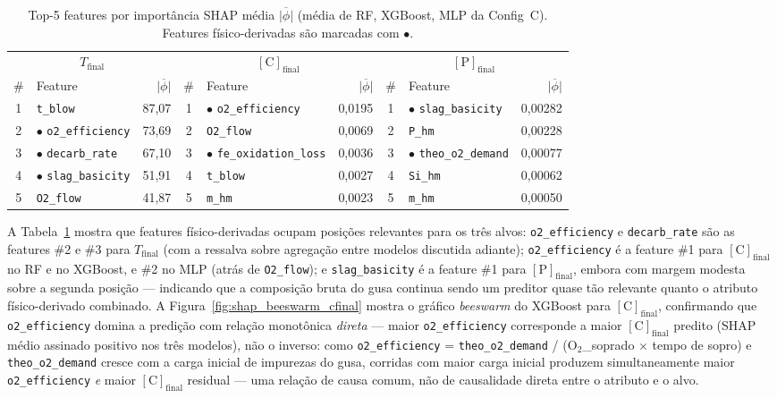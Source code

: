 \begin{table}[H]
\caption{Top-5 features por importância SHAP média $\overline{|\phi|}$ (média de RF, XGBoost, MLP da Config~C). Features físico-derivadas são marcadas com $\bullet$.}
\label{tbl:shap_importance}
\centering
\footnotesize
\setlength{\tabcolsep}{4pt}
\begin{tabular}{clrclrclr}
\hline
\multicolumn{3}{c}{$T_\text{final}$} & \multicolumn{3}{c}{$[\text{C}]_\text{final}$} & \multicolumn{3}{c}{$[\text{P}]_\text{final}$} \\
\cline{1-3}\cline{4-6}\cline{7-9}
\# & Feature & $\overline{|\phi|}$ & \# & Feature & $\overline{|\phi|}$ & \# & Feature & $\overline{|\phi|}$ \\
\hline
1 & \texttt{t\_blow}              & 87,07 & 1 & $\bullet$ \texttt{o2\_efficiency}  & 0,0195 & 1 & $\bullet$ \texttt{slag\_basicity} & 0,00282 \\
2 & $\bullet$ \texttt{o2\_efficiency}      & 73,69 & 2 & \texttt{O2\_flow}               & 0,0069 & 2 & \texttt{P\_hm}                   & 0,00228 \\
3 & $\bullet$ \texttt{decarb\_rate}        & 67,10 & 3 & $\bullet$ \texttt{fe\_oxidation\_loss}   & 0,0036 & 3 & $\bullet$ \texttt{theo\_o2\_demand}        & 0,00077 \\
4 & $\bullet$ \texttt{slag\_basicity}      & 51,91 & 4 & \texttt{t\_blow}                & 0,0027 & 4 & \texttt{Si\_hm}                  & 0,00062 \\
5 & \texttt{O2\_flow}            & 41,87 & 5 & \texttt{m\_hm}                  & 0,0023 & 5 & \texttt{m\_hm}                   & 0,00050 \\
\hline
\end{tabular}
\end{table}

A Tabela~\ref{tbl:shap_importance} mostra que features físico-derivadas ocupam posições relevantes para os três alvos: \texttt{o2\_efficiency} e \texttt{decarb\_rate} são as features \#2 e \#3 para $T_\text{final}$ (com a ressalva sobre agregação entre modelos discutida adiante); \texttt{o2\_efficiency} é a feature \#1 para $[\text{C}]_\text{final}$ no RF e no XGBoost, e \#2 no MLP (atrás de \texttt{O2\_flow}); e \texttt{slag\_basicity} é a feature \#1 para $[\text{P}]_\text{final}$, embora com margem modesta sobre a segunda posição --- indicando que a composição bruta do gusa continua sendo um preditor quase tão relevante quanto o atributo físico-derivado combinado. A Figura~\ref{fig:shap_beeswarm_cfinal} mostra o gráfico \textit{beeswarm} do XGBoost para $[\text{C}]_\text{final}$, confirmando que \texttt{o2\_efficiency} domina a predição com relação monotônica \emph{direta} --- maior \texttt{o2\_efficiency} corresponde a maior $[\text{C}]_\text{final}$ predito (SHAP médio assinado positivo nos três modelos), não o inverso: como \texttt{o2\_efficiency} = \texttt{theo\_o2\_demand} / (O$_2$\_soprado $\times$ tempo de sopro) e \texttt{theo\_o2\_demand} cresce com a carga inicial de impurezas do gusa, corridas com maior carga inicial produzem simultaneamente maior \texttt{o2\_efficiency} \emph{e} maior $[\text{C}]_\text{final}$ residual --- uma relação de causa comum, não de causalidade direta entre o atributo e o alvo.

